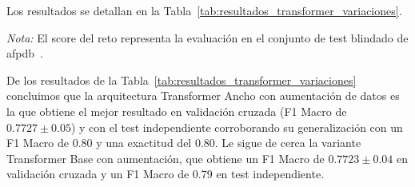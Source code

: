 Los resultados se detallan en la Tabla~\ref{tab:resultados_transformer_variaciones}.

\begin{table}[htbp]
  \centering
  \caption{Resultados de las variaciones de la arquitectura CNN-Transformer 1D con y sin aumento de datos}
  \label{tab:resultados_transformer_variaciones}
  \vskip 5pt
  \small
  \textit{Nota:} El score del reto representa la evaluación en el conjunto de test blindado de afpdb~\cite{moody_paf_2001}.
\end{table}

De los resultados de la Tabla~\ref{tab:resultados_transformer_variaciones} concluimos que la arquitectura Transformer Ancho
con aumentación de datos es la que obtiene el mejor resultado en validación cruzada (F1 Macro de $0.7727 \pm 0.05$) y con el test
independiente corroborando su generalización con un F1 Macro de 0.80 y una exactitud del 0.80.
Le sigue de cerca la variante Transformer Base con aumentación, que obtiene un F1 Macro de $0.7723 \pm 0.04$ en validación cruzada
y un F1 Macro de 0.79 en test independiente.

